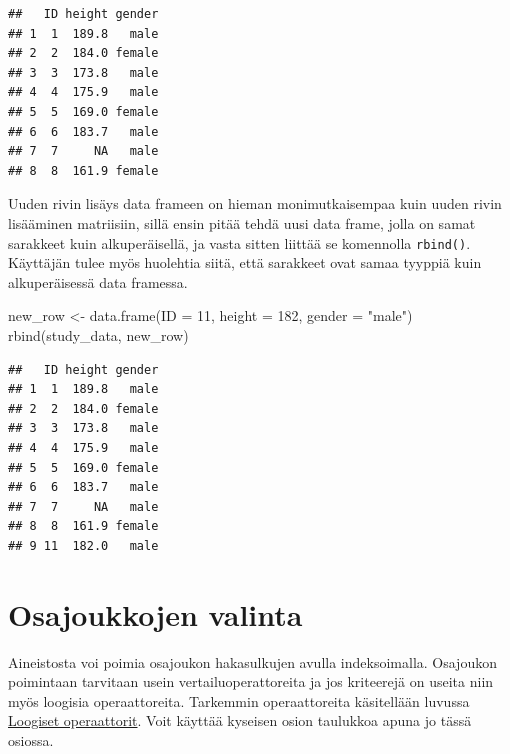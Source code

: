 \documentclass[
]{book}
\newenvironment{Shaded}{\begin{snugshade}}{\end{snugshade}}
\newcommand{\AttributeTok}[1]{\textcolor[rgb]{0.77,0.63,0.00}{#1}}
\newcommand{\CommentTok}[1]{\textcolor[rgb]{0.56,0.35,0.01}{\textit{#1}}}
\newcommand{\DecValTok}[1]{\textcolor[rgb]{0.00,0.00,0.81}{#1}}
\newcommand{\FunctionTok}[1]{\textcolor[rgb]{0.00,0.00,0.00}{#1}}
\newcommand{\NormalTok}[1]{#1}
\newcommand{\OtherTok}[1]{\textcolor[rgb]{0.56,0.35,0.01}{#1}}
\newcommand{\SpecialCharTok}[1]{\textcolor[rgb]{0.00,0.00,0.00}{#1}}
\newcommand{\StringTok}[1]{\textcolor[rgb]{0.31,0.60,0.02}{#1}}
\begin{document}
\begin{verbatim}
##   ID height gender
## 1  1  189.8   male
## 2  2  184.0 female
## 3  3  173.8   male
## 4  4  175.9   male
## 5  5  169.0 female
## 6  6  183.7   male
## 7  7     NA   male
## 8  8  161.9 female
\end{verbatim}

Uuden rivin lisäys data frameen on hieman monimutkaisempaa kuin uuden rivin lisääminen matriisiin, sillä ensin pitää tehdä uusi data frame, jolla on samat sarakkeet kuin alkuperäisellä, ja vasta sitten liittää se komennolla \texttt{rbind()}. Käyttäjän tulee myös huolehtia siitä, että sarakkeet ovat samaa tyyppiä kuin alkuperäisessä data framessa.

\begin{Shaded}
\begin{Highlighting}[]
\NormalTok{new\_row }\OtherTok{\textless{}{-}} \FunctionTok{data.frame}\NormalTok{(}\AttributeTok{ID =} \DecValTok{11}\NormalTok{, }\AttributeTok{height =} \DecValTok{182}\NormalTok{, }\AttributeTok{gender =} \StringTok{"male"}\NormalTok{)}
\FunctionTok{rbind}\NormalTok{(study\_data, new\_row)}
\end{Highlighting}
\end{Shaded}

\begin{verbatim}
##   ID height gender
## 1  1  189.8   male
## 2  2  184.0 female
## 3  3  173.8   male
## 4  4  175.9   male
## 5  5  169.0 female
## 6  6  183.7   male
## 7  7     NA   male
## 8  8  161.9 female
## 9 11  182.0   male
\end{verbatim}

\hypertarget{osajoukkojen-valinta}{%
\section{Osajoukkojen valinta}\label{osajoukkojen-valinta}}

Aineistosta voi poimia osajoukon hakasulkujen avulla indeksoimalla. Osajoukon poimintaan tarvitaan usein vertailuoperattoreita ja jos kriteerejä on useita niin myös loogisia operaattoreita. Tarkemmin operaattoreita käsitellään luvussa \protect\hyperlink{loogiset-operaattorit}{Loogiset operaattorit}. Voit käyttää kyseisen osion taulukkoa apuna jo tässä osiossa.

\begin{Shaded}
\end{Shaded}
\end{document}
